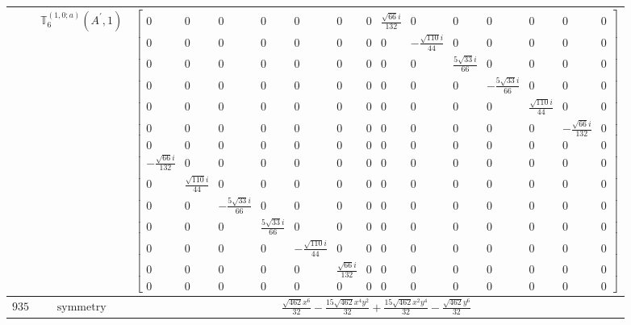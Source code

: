 \documentclass[fleqn,8pt,landscape]{jsarticle}
\begin{document}
\begin{longtable}{ccc}
$  $ & $ \mathbb{T}_{6}^{(1,0;a)}(A^{\prime},1) $ & $ \begin{bmatrix} 0 & 0 & 0 & 0 & 0 & 0 & 0 & \frac{\sqrt{66} i}{132} & 0 & 0 & 0 & 0 & 0 & 0 \\ 0 & 0 & 0 & 0 & 0 & 0 & 0 & 0 & - \frac{\sqrt{110} i}{44} & 0 & 0 & 0 & 0 & 0 \\ 0 & 0 & 0 & 0 & 0 & 0 & 0 & 0 & 0 & \frac{5 \sqrt{33} i}{66} & 0 & 0 & 0 & 0 \\ 0 & 0 & 0 & 0 & 0 & 0 & 0 & 0 & 0 & 0 & - \frac{5 \sqrt{33} i}{66} & 0 & 0 & 0 \\ 0 & 0 & 0 & 0 & 0 & 0 & 0 & 0 & 0 & 0 & 0 & \frac{\sqrt{110} i}{44} & 0 & 0 \\ 0 & 0 & 0 & 0 & 0 & 0 & 0 & 0 & 0 & 0 & 0 & 0 & - \frac{\sqrt{66} i}{132} & 0 \\ 0 & 0 & 0 & 0 & 0 & 0 & 0 & 0 & 0 & 0 & 0 & 0 & 0 & 0 \\ - \frac{\sqrt{66} i}{132} & 0 & 0 & 0 & 0 & 0 & 0 & 0 & 0 & 0 & 0 & 0 & 0 & 0 \\ 0 & \frac{\sqrt{110} i}{44} & 0 & 0 & 0 & 0 & 0 & 0 & 0 & 0 & 0 & 0 & 0 & 0 \\ 0 & 0 & - \frac{5 \sqrt{33} i}{66} & 0 & 0 & 0 & 0 & 0 & 0 & 0 & 0 & 0 & 0 & 0 \\ 0 & 0 & 0 & \frac{5 \sqrt{33} i}{66} & 0 & 0 & 0 & 0 & 0 & 0 & 0 & 0 & 0 & 0 \\ 0 & 0 & 0 & 0 & - \frac{\sqrt{110} i}{44} & 0 & 0 & 0 & 0 & 0 & 0 & 0 & 0 & 0 \\ 0 & 0 & 0 & 0 & 0 & \frac{\sqrt{66} i}{132} & 0 & 0 & 0 & 0 & 0 & 0 & 0 & 0 \\ 0 & 0 & 0 & 0 & 0 & 0 & 0 & 0 & 0 & 0 & 0 & 0 & 0 & 0 \end{bmatrix} $ \\ \hline
$ 935 $ & $ \text{symmetry} $ & $ \frac{\sqrt{462} x^{6}}{32} - \frac{15 \sqrt{462} x^{4} y^{2}}{32} + \frac{15 \sqrt{462} x^{2} y^{4}}{32} - \frac{\sqrt{462} y^{6}}{32} $ \\

\end{longtable}
\end{document}
